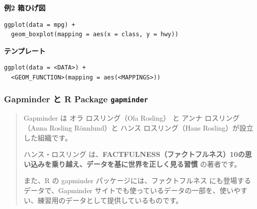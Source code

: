 \documentclass[
  xelatex, ja=standard]{bxjsbook}
\theoremstyle{definition}
\theoremstyle{definition}
\theoremstyle{definition}
\theoremstyle{definition}
\theoremstyle{remark}
\begin{document}
\textbf{例2 箱ひげ図}

\begin{verbatim}
ggplot(data = mpg) + 
  geom_boxplot(mapping = aes(x = class, y = hwy))
\end{verbatim}

\textbf{テンプレート}

\begin{verbatim}
ggplot(data = <DATA>) + 
  <GEOM_FUNCTION>(mapping = aes(<MAPPINGS>))
\end{verbatim}

\hypertarget{gapminder-ux3068-r-package-gapminder}{%
\subsubsection{\texorpdfstring{Gapminder と R Package \texttt{gapminder}}{Gapminder と R Package gapminder}}\label{gapminder-ux3068-r-package-gapminder}}

\begin{quote}
Gapminder は オラ ロスリング（Ola Rosling） と アンナ ロスリング（Anna Rosling Rönnlund）と ハンス ロスリング（Hans Rosling）が設立した組織です。

ハンス・ロスリング は、\textbf{FACTFULNESS（ファクトフルネス）10の思い込みを乗り越え、データを基に世界を正しく見る習慣} の著者です。

また、R の gapminder パッケージには、ファクトフルネス にも登場するデータで、Gapminder サイトでも使っているデータの一部を、使いやすい、練習用のデータとして提供しているものです。
\end{quote}
\end{document}
